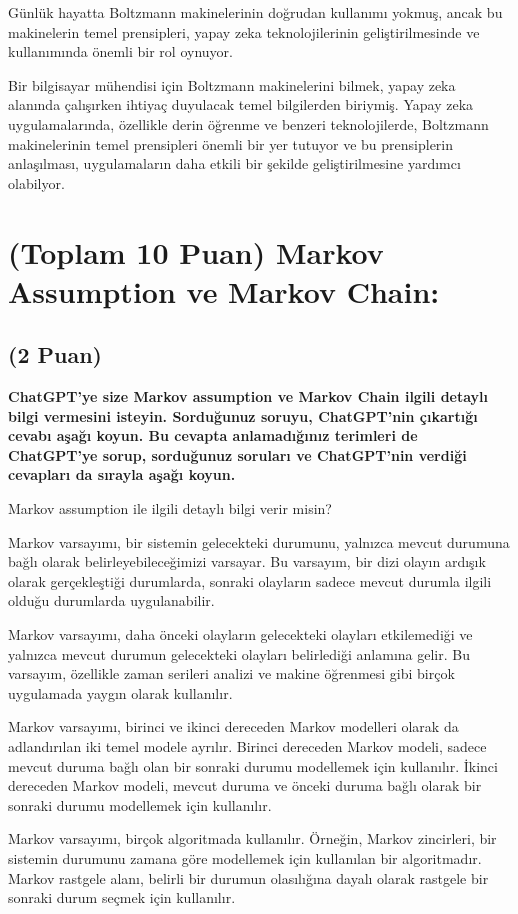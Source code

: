 \documentclass[11pt]{article}
\begin{document}
Günlük hayatta Boltzmann makinelerinin doğrudan kullanımı yokmuş, ancak bu makinelerin temel prensipleri, yapay zeka teknolojilerinin geliştirilmesinde ve kullanımında önemli bir rol oynuyor.

Bir bilgisayar mühendisi için Boltzmann makinelerini bilmek, yapay zeka alanında çalışırken ihtiyaç duyulacak temel bilgilerden biriymiş. Yapay zeka uygulamalarında, özellikle derin öğrenme ve benzeri teknolojilerde, Boltzmann makinelerinin temel prensipleri önemli bir yer tutuyor ve bu prensiplerin anlaşılması, uygulamaların daha etkili bir şekilde geliştirilmesine yardımcı olabilyor.


\section{(Toplam 10 Puan) Markov Assumption ve Markov Chain:}

\subsection{(2 Puan)} \textbf{ChatGPT’ye size Markov assumption ve Markov Chain ilgili detaylı bilgi vermesini isteyin. Sorduğunuz soruyu, ChatGPT'nin çıkartığı cevabı aşağı koyun. Bu cevapta anlamadığınız terimleri de ChatGPT’ye sorup, sorduğunuz soruları ve ChatGPT’nin verdiği cevapları da sırayla aşağı koyun.}

Markov assumption ile ilgili detaylı bilgi verir misin?

Markov varsayımı, bir sistemin gelecekteki durumunu, yalnızca mevcut durumuna bağlı olarak belirleyebileceğimizi varsayar. Bu varsayım, bir dizi olayın ardışık olarak gerçekleştiği durumlarda, sonraki olayların sadece mevcut durumla ilgili olduğu durumlarda uygulanabilir.

Markov varsayımı, daha önceki olayların gelecekteki olayları etkilemediği ve yalnızca mevcut durumun gelecekteki olayları belirlediği anlamına gelir. Bu varsayım, özellikle zaman serileri analizi ve makine öğrenmesi gibi birçok uygulamada yaygın olarak kullanılır.

Markov varsayımı, birinci ve ikinci dereceden Markov modelleri olarak da adlandırılan iki temel modele ayrılır. Birinci dereceden Markov modeli, sadece mevcut duruma bağlı olan bir sonraki durumu modellemek için kullanılır. İkinci dereceden Markov modeli, mevcut duruma ve önceki duruma bağlı olarak bir sonraki durumu modellemek için kullanılır.

Markov varsayımı, birçok algoritmada kullanılır. Örneğin, Markov zincirleri, bir sistemin durumunu zamana göre modellemek için kullanılan bir algoritmadır. Markov rastgele alanı, belirli bir durumun olasılığına dayalı olarak rastgele bir sonraki durum seçmek için kullanılır.
\end{document}
